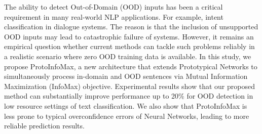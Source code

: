 The ability to detect Out-of-Domain (OOD) inputs has been a critical requirement in many real-world NLP applications. For example, intent classification in dialogue systems. The reason is that the inclusion of unsupported OOD inputs may lead to catastrophic failure of systems. However, it remains an empirical question whether current methods can tackle such problems reliably in a realistic scenario where zero OOD training data is available. In this study, we propose ProtoInfoMax, a new architecture that extends Prototypical Networks to simultaneously process in-domain and OOD sentences via Mutual Information Maximization (InfoMax) objective. Experimental results show that our proposed method can substantially improve performance up to 20\% for OOD detection in low resource settings of text classification. We also show that ProtoInfoMax is less prone to typical overconfidence errors of Neural Networks, leading to more reliable prediction results.
